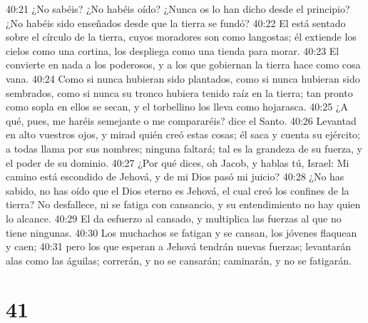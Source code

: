 40:21 ¿No sabéis? ¿No habéis oído? ¿Nunca os lo han dicho desde el principio? ¿No habéis sido enseñados desde que la tierra se fundó?  
40:22 El está sentado sobre el círculo de la tierra, cuyos moradores son como langostas; él extiende los cielos como una cortina, los despliega como una tienda para morar.  
40:23 El convierte en nada a los poderosos, y a los que gobiernan la tierra hace como cosa vana.  
40:24 Como si nunca hubieran sido plantados, como si nunca hubieran sido sembrados, como si nunca su tronco hubiera tenido raíz en la tierra; tan pronto como sopla en ellos se secan, y el torbellino los lleva como hojarasca.  
40:25 ¿A qué, pues, me haréis semejante o me compararéis? dice el Santo.  
40:26 Levantad en alto vuestros ojos, y mirad quién creó estas cosas; él saca y cuenta su ejército; a todas llama por sus nombres; ninguna faltará; tal es la grandeza de su fuerza, y el poder de su dominio.  
40:27 ¿Por qué dices, oh Jacob, y hablas tú, Israel: Mi camino está escondido de Jehová, y de mi Dios pasó mi juicio?  
40:28 ¿No has sabido, no has oído que el Dios eterno es Jehová, el cual creó los confines de la tierra? No desfallece, ni se fatiga con cansancio, y su entendimiento no hay quien lo alcance.  
40:29 El da esfuerzo al cansado, y multiplica las fuerzas al que no tiene ningunas.  
40:30 Los muchachos se fatigan y se cansan, los jóvenes flaquean y caen;  
40:31 pero los que esperan a Jehová tendrán nuevas fuerzas; levantarán alas como las águilas; correrán, y no se cansarán; caminarán, y no se fatigarán.  

\chapter{41}

